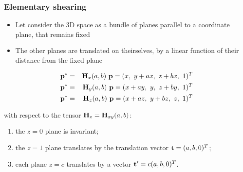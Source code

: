 \documentclass{beamer}
\begin{document}
\begin{frame}\frametitle{Elementary shearing}\small

\begin{itemize}
\item Let consider the 3D space as a bundle of planes parallel to a coordinate plane, that remains fixed 
\item The other planes are translated on theirselves, by a linear function of their distance from the fixed plane 
\end{itemize}


\begin{eqnarray*}
\p{p}^* &=& \T{H}_x(a,b)\ \p{p}  = (x,\  y + ax,\  z + bx,\  1)^T\\
\p{p}^* &=& \T{H}_y(a,b)\ \p{p}  = (x + ay,\  y,\  z + by,\ 1)^T\\
\p{p}^* &=& \T{H}_z(a,b)\ \p{p}  = (x+ az,\ y + bz,\  z,\  1)^T
\end{eqnarray*}

\vfill

with respect to the tensor ${\bf H}_z={\bf H}_{xy}(a,b)$:

\begin{enumerate}
    \item
    the $z=0$ plane is invariant;

    \item\vspace{-2mm}
    the $z=1$ plane translates by the translation vector
    ${\bf t}=(a,b,0)^{T}$;

    \item\vspace{-2mm}
    each plane $z=c$ translates by a vector ${\bf t}'= c (a,b,0)^{T}$.
\end{enumerate}


\end{frame}
\end{document}

